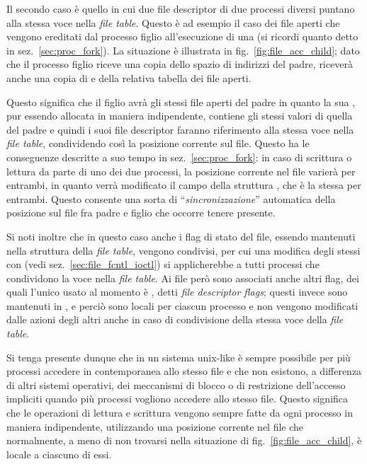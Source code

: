 Il secondo caso è quello in cui due file descriptor di due processi diversi
puntano alla stessa voce nella \textit{file table}.  Questo è ad esempio il
caso dei file aperti che vengono ereditati dal processo figlio all'esecuzione
di una  (si ricordi quanto detto in sez.~\ref{sec:proc_fork}). La
situazione è illustrata in fig.~\ref{fig:file_acc_child}; dato che il processo
figlio riceve una copia dello spazio di indirizzi del padre, riceverà anche
una copia di  e della relativa tabella dei file aperti.

Questo significa che il figlio avrà gli stessi file aperti del padre in
quanto la sua , pur essendo allocata in maniera
indipendente, contiene gli stessi valori di quella del padre e quindi i suoi
file descriptor faranno riferimento alla stessa voce nella \textit{file
  table}, condividendo così la posizione corrente sul file. Questo ha le
conseguenze descritte a suo tempo in sez.~\ref{sec:proc_fork}: in caso di
scrittura o lettura da parte di uno dei due processi, la posizione corrente
nel file varierà per entrambi, in quanto verrà modificato il campo
 della struttura , che è la stessa per
entrambi. Questo consente una sorta di ``\textsl{sincronizzazione}''
automatica della posizione sul file fra padre e figlio che occorre tenere
presente.

Si noti inoltre che in questo caso anche i flag di stato del file, essendo
mantenuti nella struttura  della \textit{file table}, vengono
condivisi, per cui una modifica degli stessi con  (vedi
sez.~\ref{sec:file_fcntl_ioctl}) si applicherebbe a tutti processi che
condividono la voce nella \textit{file table}. Ai file però sono associati
anche altri flag, dei quali l'unico usato al momento è ,
detti  \textit{file descriptor flags}; questi
invece sono mantenuti in , e perciò sono locali per
ciascun processo e non vengono modificati dalle azioni degli altri anche in
caso di condivisione della stessa voce della \textit{file table}.

Si tenga presente dunque che in un sistema unix-like è sempre possibile per
più processi accedere in contemporanea allo stesso file e che non esistono, a
differenza di altri sistemi operativi, dei meccanismi di blocco o di
restrizione dell'accesso impliciti quando più processi vogliono accedere allo
stesso file. Questo significa che le operazioni di lettura e scrittura vengono
sempre fatte da ogni processo in maniera indipendente, utilizzando una
posizione corrente nel file che normalmente, a meno di non trovarsi nella
situazione di fig.~\ref{fig:file_acc_child}, è locale a ciascuno di essi.


